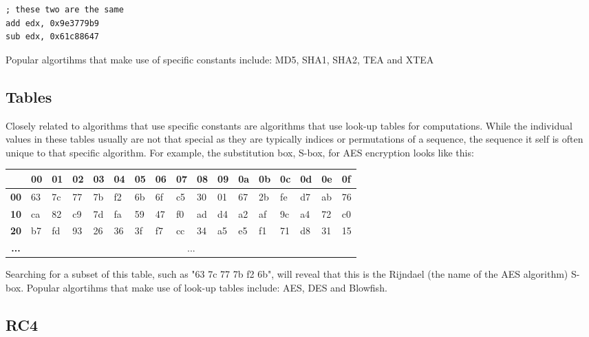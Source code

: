 \documentclass[twocolumn]{article}
\begin{document}
\begin{verbatim}
; these two are the same
add edx, 0x9e3779b9
sub edx, 0x61c88647
\end{verbatim}

\vspace*{-0.7\baselineskip}
Popular algortihms that make use of specific constants include: MD5, SHA1, SHA2, TEA and XTEA
\vspace*{-1.2\baselineskip}


\subsection*{Tables}
\vspace*{-0.4\baselineskip}

Closely related to algorithms that use specific constants are algorithms that use look-up tables for computations. While the individual values in these tables usually are not that special as they are typically indices or permutations of a sequence, the sequence it self is often unique to that specific algorithm. For example, the substitution box, S-box, for AES encryption looks like this:

\begin{table}[!h]
\setlength{\tabcolsep}{3pt}
    \tiny
    \begin{tabular}{|>{\bfseries}c|l|l|l|l|l|l|l|l|l|l|l|l|l|l|l|l|}
\hline
   & \textbf{00} & \textbf{01} & \textbf{02} & \textbf{03} & \textbf{04} & \textbf{05} & \textbf{06} & \textbf{07} & \textbf{08} & \textbf{09} & \textbf{0a} & \textbf{0b} & \textbf{0c} & \textbf{0d} & \textbf{0e} & \textbf{0f} \\ \hline
00 & 63 & 7c & 77 & 7b & f2 & 6b & 6f & c5 & 30 & 01 & 67 & 2b & fe & d7 & ab & 76 \\ \hline
10 & ca & 82 & c9 & 7d & fa & 59 & 47 & f0 & ad & d4 & a2 & af & 9c & a4 & 72 & c0 \\ \hline
20 & b7 & fd & 93 & 26 & 36 & 3f & f7 & cc & 34 & a5 & e5 & f1 & 71 & d8 & 31 & 15 \\ 
... & \multicolumn{16}{c}{...}
    \end{tabular}
\end{table}

Searching for a subset of this table, such as "63 7c 77 7b f2 6b", will reveal that this is the Rijndael (the name of the AES algorithm) S-box. Popular algortihms that make use of look-up tables include: AES, DES and Blowfish.


\subsection*{RC4}
\end{document}
